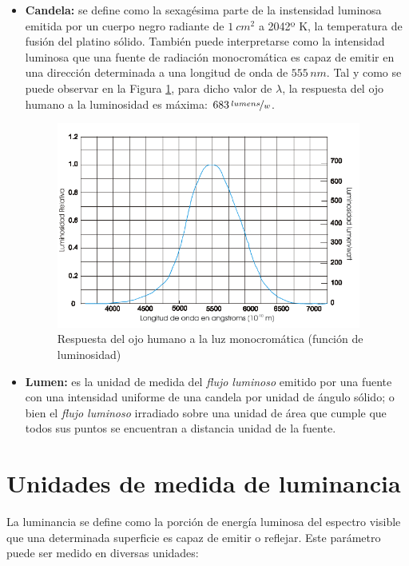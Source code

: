 \documentclass[a4paper, 12pt]{report}
\begin{document}
\begin{itemize}
    \item \textbf{Candela: } se define como la sexagésima parte de la instensidad luminosa emitida por un cuerpo negro radiante de {\footnotesize $ 1\:cm^2$} a 2042º K, la temperatura de fusión del platino sólido. También puede interpretarse como la intensidad luminosa que una fuente de radiación monocromática es capaz de emitir en una dirección determinada a una longitud de onda de {\footnotesize $555 \, nm$}. Tal y como se puede observar en la Figura \ref{fig:func_luminosidad}, para dicho valor de {\footnotesize $\lambda$}, la respuesta del ojo humano a la luminosidad es máxima: {\footnotesize $683\, \nicefrac{lumens}{w}$}.
    
    \begin{figure}[H]
        \centering
        \includegraphics[width=10cm, keepaspectratio]{img/APENDICES/B/tf_luminosidad.png}
        \caption{Respuesta del ojo humano a la luz monocromática (función de luminosidad)}
        \label{fig:func_luminosidad}
    \end{figure}
    \item \textbf{Lumen:} es la unidad de medida del \textit{flujo luminoso} emitido por una fuente con una intensidad uniforme de una candela por unidad de ángulo sólido; o bien el \textit{flujo luminoso} irradiado sobre una unidad de área que cumple que todos sus puntos se encuentran a distancia unidad de la fuente.
    
\end{itemize}


\section{Unidades de medida de luminancia}
\label{sec:luminance_units}

La luminancia se define como la porción de energía luminosa  del espectro visible que una determinada superficie es capaz de emitir o reflejar. Este parámetro puede ser medido en diversas unidades:
\end{document}
